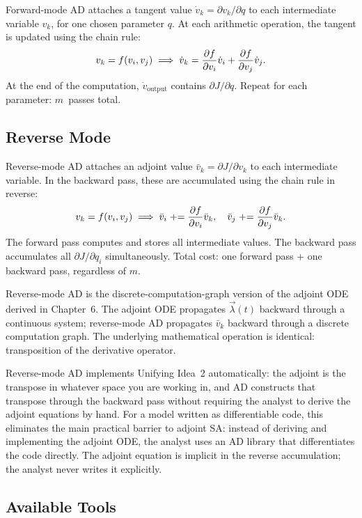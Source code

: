 Forward-mode AD attaches a tangent value $\dot{v}_k = \partial v_k/\partial q$
to each intermediate variable $v_k$, for one chosen parameter $q$.
At each arithmetic operation, the tangent is updated using the chain rule:
\[
  v_k = f(v_i, v_j) \implies
  \dot{v}_k = \frac{\partial f}{\partial v_i}\dot{v}_i + \frac{\partial f}{\partial v_j}\dot{v}_j.
\]
At the end of the computation, $\dot{v}_{\text{output}}$ contains
$\partial J/\partial q$. Repeat for each parameter: $m$~passes total.

\subsection{Reverse Mode}

Reverse-mode AD attaches an adjoint value $\bar{v}_k = \partial J/\partial v_k$
to each intermediate variable. In the backward pass, these are accumulated
using the chain rule in reverse:
\[
  v_k = f(v_i, v_j) \implies
  \bar{v}_i \mathrel{+}= \frac{\partial f}{\partial v_i}\bar{v}_k, \quad
  \bar{v}_j \mathrel{+}= \frac{\partial f}{\partial v_j}\bar{v}_k.
\]
The forward pass computes and stores all intermediate values.
The backward pass accumulates all $\partial J/\partial q_i$ simultaneously.
Total cost: one forward pass + one backward pass, regardless of $m$.

Reverse-mode AD is the discrete-computation-graph version
of the adjoint ODE derived in Chapter~6. The adjoint ODE propagates
$\vec{\lambda}(t)$ backward through a continuous system; reverse-mode
AD propagates $\bar{v}_k$ backward through a discrete computation graph.
The underlying mathematical operation is identical: transposition of
the derivative operator.

 Reverse-mode AD implements Unifying Idea~2 automatically:
the adjoint is the transpose in whatever space you are working in, and AD
constructs that transpose through the backward pass without requiring the analyst to derive the adjoint equations by hand.
For a model written as differentiable code, this eliminates the main
practical barrier to adjoint SA: instead of deriving and implementing
the adjoint ODE, the analyst uses an AD library that differentiates
the code directly. The adjoint equation is implicit in the
reverse accumulation; the analyst never writes it explicitly.

\subsection{Available Tools}

